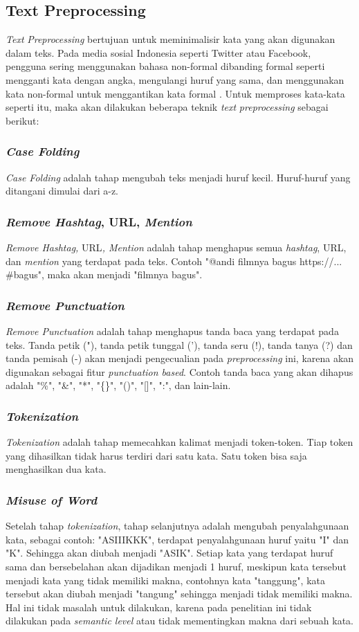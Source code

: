 \subsection{Text Preprocessing}
\textit{Text} \textit{Preprocessing} bertujuan untuk meminimalisir 
kata yang akan digunakan dalam teks. Pada media sosial Indonesia seperti 
Twitter atau Facebook, pengguna sering menggunakan bahasa non-formal 
dibanding formal seperti mengganti kata dengan angka, mengulangi huruf 
yang sama, dan menggunakan kata non-formal untuk menggantikan kata 
formal \cite{5}. Untuk memproses kata-kata seperti itu, maka akan 
dilakukan beberapa teknik \textit{text} \textit{preprocessing }
sebagai berikut: 
\subsubsection{\textit{Case Folding}}
\textit{Case Folding }adalah tahap mengubah teks menjadi huruf kecil. 
Huruf-huruf yang ditangani dimulai dari a-z.
\subsubsection{\textit{Remove Hashtag}, URL, \textit{Mention}}
\textit{Remove Hashtag, }URL\textit{, Mention }adalah tahap 
menghapus semua \textit{hashtag}, URL, dan \textit{mention }yang 
terdapat pada teks. Contoh "@andi filmnya bagus https://... \#bagus", 
maka akan menjadi "filmnya bagus".
\subsubsection{\textit{Remove Punctuation}}
\textit{Remove Punctuation }adalah tahap menghapus tanda baca yang 
terdapat pada teks. Tanda petik ("), tanda petik tunggal ('), tanda 
seru (!), tanda tanya (?) dan tanda pemisah (-) akan menjadi 
pengecualian pada \textit{preprocessing }ini, karena akan digunakan 
sebagai fitur \textit{punctuation based}. Contoh tanda baca yang akan 
dihapus adalah "\%", "\&", "*", "\{\}", "()", "[]", ":", dan lain-lain.
\subsubsection{\textit{Tokenization}}
\textit{Tokenization} adalah tahap memecahkan kalimat menjadi 
token-token. Tiap token yang dihasilkan tidak harus terdiri dari satu 
kata. Satu token bisa saja menghasilkan dua kata. 
\subsubsection{\textit{Misuse of Word}}
Setelah tahap \textit{tokenization}, tahap selanjutnya adalah 
mengubah penyalahgunaan kata, sebagai contoh: "ASIIIKKK", terdapat 
penyalahgunaan huruf yaitu "I" dan "K". Sehingga akan diubah menjadi 
"ASIK". Setiap kata yang terdapat huruf sama dan bersebelahan akan 
dijadikan menjadi 1 huruf, meskipun kata tersebut menjadi kata yang 
tidak memiliki makna, contohnya kata "tanggung", kata tersebut akan 
diubah menjadi "tangung" sehingga menjadi tidak memiliki makna. Hal 
ini tidak masalah untuk dilakukan, karena pada penelitian ini tidak 
dilakukan pada \textit{semantic level} atau tidak mementingkan makna 
dari sebuah kata.  
